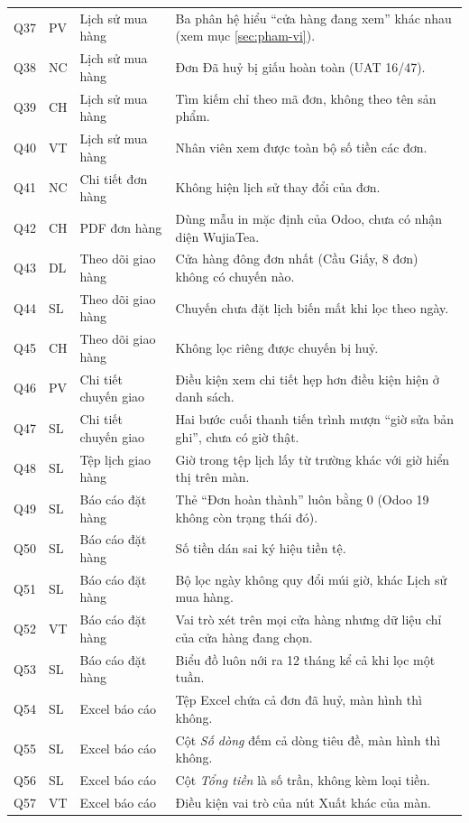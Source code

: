 {\begin{longtable}{@{}L{0.8cm}L{1.1cm}L{3.4cm}L{9.4cm}@{}}
Q37 & PV & Lịch sử mua hàng & Ba phân hệ hiểu ``cửa hàng đang xem'' khác nhau (xem mục \ref{sec:pham-vi}). \\
Q38 & NC & Lịch sử mua hàng & Đơn Đã huỷ bị giấu hoàn toàn (UAT 16/47). \\
Q39 & CH & Lịch sử mua hàng & Tìm kiếm chỉ theo mã đơn, không theo tên sản phẩm. \\
Q40 & VT & Lịch sử mua hàng & Nhân viên xem được toàn bộ số tiền các đơn. \\
Q41 & NC & Chi tiết đơn hàng & Không hiện lịch sử thay đổi của đơn. \\
Q42 & CH & PDF đơn hàng & Dùng mẫu in mặc định của Odoo, chưa có nhận diện WujiaTea. \\
Q43 & DL & Theo dõi giao hàng & Cửa hàng đông đơn nhất (Cầu Giấy, 8 đơn) không có chuyến nào. \\
Q44 & SL & Theo dõi giao hàng & Chuyến chưa đặt lịch biến mất khi lọc theo ngày. \\
Q45 & CH & Theo dõi giao hàng & Không lọc riêng được chuyến bị huỷ. \\
Q46 & PV & Chi tiết chuyến giao & Điều kiện xem chi tiết hẹp hơn điều kiện hiện ở danh sách. \\
Q47 & SL & Chi tiết chuyến giao & Hai bước cuối thanh tiến trình mượn ``giờ sửa bản ghi'', chưa có giờ thật. \\
Q48 & SL & Tệp lịch giao hàng & Giờ trong tệp lịch lấy từ trường khác với giờ hiển thị trên màn. \\
Q49 & SL & Báo cáo đặt hàng & Thẻ ``Đơn hoàn thành'' luôn bằng 0 (Odoo 19 không còn trạng thái đó). \\
Q50 & SL & Báo cáo đặt hàng & Số tiền dán sai ký hiệu tiền tệ. \\
Q51 & SL & Báo cáo đặt hàng & Bộ lọc ngày không quy đổi múi giờ, khác Lịch sử mua hàng. \\
Q52 & VT & Báo cáo đặt hàng & Vai trò xét trên mọi cửa hàng nhưng dữ liệu chỉ của cửa hàng đang chọn. \\
Q53 & SL & Báo cáo đặt hàng & Biểu đồ luôn nới ra 12 tháng kể cả khi lọc một tuần. \\
Q54 & SL & Excel báo cáo & Tệp Excel chứa cả đơn đã huỷ, màn hình thì không. \\
Q55 & SL & Excel báo cáo & Cột \emph{Số dòng} đếm cả dòng tiêu đề, màn hình thì không. \\
Q56 & SL & Excel báo cáo & Cột \emph{Tổng tiền} là số trần, không kèm loại tiền. \\
Q57 & VT & Excel báo cáo & Điều kiện vai trò của nút Xuất khác của màn. \\

\end{longtable}}
